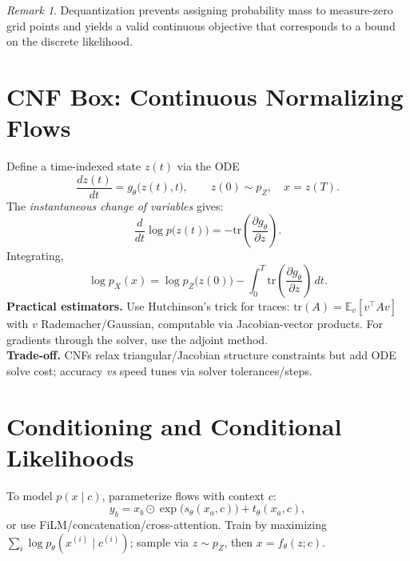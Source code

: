 \documentclass[11pt]{article}
\newcommand{\E}{\mathbb{E}}
\theoremstyle{remark}
\newtheorem*{remark}{Remark}
\newcommand{\pdv}[2]{\frac{\partial #1}{\partial #2}}
\begin{document}
\begin{remark}
Dequantization prevents assigning probability mass to measure-zero grid points and yields a valid continuous objective that corresponds to a bound on the discrete likelihood.
\end{remark}

\section*{CNF Box: Continuous Normalizing Flows}
\begin{tcolorbox}[title=\textbf{Continuous Normalizing Flows (CNF)}]
Define a time-indexed state $z(t)$ via the ODE
\begin{equation}
\frac{d z(t)}{dt} = g_\theta\big(z(t), t\big), \qquad z(0)\sim p_Z,\quad x=z(T).
\label{eq:cnf-ode}
\end{equation}
The \emph{instantaneous change of variables} gives:
\begin{equation}
\frac{d}{dt}\log p\big(z(t)\big) = -\mathrm{tr}\!\left(\pdv{g_\theta}{z}\right).
\label{eq:cnf-icov}
\end{equation}
Integrating,
\begin{equation}
\log p_X(x) = \log p_Z\big(z(0)\big) - \int_{0}^{T} \mathrm{tr}\!\left(\pdv{g_\theta}{z}\right)\, dt.
\label{eq:cnf-loglik}
\end{equation}
\textbf{Practical estimators.} Use Hutchinson's trick for traces:
$\mathrm{tr}(A) = \E_{v}\left[v^\top A v\right]$ with $v$ Rademacher/Gaussian, computable via Jacobian-vector products. For gradients through the solver, use the adjoint method.\\[0.25em]
\textbf{Trade-off.} CNFs relax triangular/Jacobian structure constraints but add ODE solve cost; accuracy \emph{vs} speed tunes via solver tolerances/steps.
\end{tcolorbox}

\section{Conditioning and Conditional Likelihoods}
To model $p(x\mid c)$, parameterize flows with context $c$:
\begin{equation}
y_b = x_b \odot \exp\!\big(s_\theta(x_a,c)\big) + t_\theta(x_a,c),
\label{eq:cond-coupling}
\end{equation}
or use FiLM/concatenation/cross-attention. Train by maximizing $\sum_i \log p_\theta(x^{(i)}\mid c^{(i)})$; sample via $z\sim p_Z$, then $x=f_\theta(z;c)$.
\end{document}
